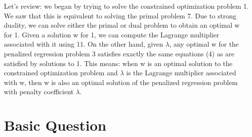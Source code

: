 \documentclass{article}
\newenvironment{qparts}{\begin{enumerate}[1.]}{\end{enumerate}}
\begin{document}
\begin{qparts}
{Let’s review: we began by trying to solve the constrained optimization problem 1. We saw that this is equivalent to solving the primal problem 7. Due to strong duality, we can solve either the primal or dual problem to obtain an optimal w for 1. Given a solution w for 1, we can compute the Lagrange multiplier associated with it using 11. On the other hand, given $\lambda$, any optimal w for the penalized regression problem 3 satisfies exactly the same equations (4) as are satisfied by solutions to 1. This means: when w is an optimal solution to the constrained optimization problem and $\lambda$ is the Lagrange
multiplier associated with w, then w is also an optimal solution of the penalized regression problem with penalty coefficient $\lambda$.
}


\end{qparts}
\newpage
\section{Basic Question}
\end{document}
